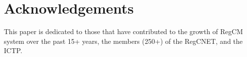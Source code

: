 \section*{Acknowledgements}

This paper is dedicated to those that have contributed to the growth
of RegCM system over the past 15+ years, the members (250+) of the
RegCNET, and the ICTP.

